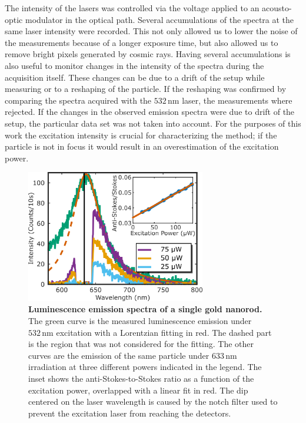 \documentclass[journal=nalefd,manuscript=letter]{achemso}
\newcommand{\nm}{\ensuremath{\,\textrm{nm}}}
\begin{document}
The intensity of the lasers was controlled via the voltage applied to an
acousto-optic modulator in the optical path. Several accumulations of the
spectra at the same laser intensity were recorded. This not only allowed us to
lower the noise of the measurements because of a longer exposure time, but also
allowed us to remove bright pixels generated by cosmic rays. Having several
accumulations is also useful to monitor changes in the intensity of the spectra
during the acquisition itself. These changes can be due to a drift of the setup
while measuring or to a reshaping of the particle. If the reshaping was
confirmed by comparing the spectra acquired with the $532\nm$
laser\cite{Liu2009}, the measurements where rejected. If the changes in the
observed emission spectra were due to drift of the setup, the particular data
set was not taken into account. For the purposes of this work the excitation
intensity is crucial for characterizing the method; if the particle is not in
focus it would result in an overestimation of the excitation power. 


\begin{figure}[tp] \centering
\includegraphics[width=78.4mm]{Figures/02_Several_Intensities/02_several_intensities.png}
\caption{\textbf{Luminescence emission spectra of a single gold nanorod.} The green curve is the
measured luminescence emission under $532\nm$ excitation with a Lorentzian fitting in red. The
dashed part is the region that was not considered for the fitting. The other
curves are the emission of the same particle under $633\nm$ irradiation at three 
different powers indicated in the legend. The inset shows the anti-Stokes-to-Stokes ratio as a function
of the excitation power, overlapped with a linear fit in red. The dip centered on the laser wavelength
is caused by the notch filter used to prevent the excitation laser from reaching the detectors.}
	\label{fig:spectra_intensity}
\end{figure}
\end{document}
